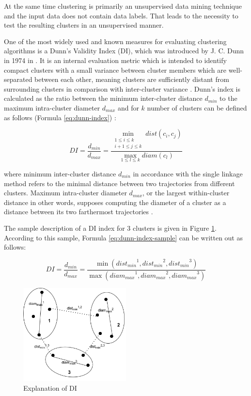 At the same time clustering is primarily an unsupervised data mining technique and the input data does not contain data labels. That leads to the necessity to test the resulting clusters in an unsupervised manner. 

One of the most widely used and known measures for evaluating clustering algorithms is a Dunn's Validity Index (DI), which was introduced by J. C. Dunn in 1974 in \cite{article:dunn_orig}. It is an internal evaluation metric which is intended to identify compact clusters with a small variance between cluster members which are well-separated between each other, meaning clusters are sufficiently distant from surrounding clusters in comparison with inter-cluster variance \cite{online:hier_clust_r}. Dunn's index is calculated as the ratio between the minimum inter-cluster distance $d_{min}$ to the maximum intra-cluster diameter $d_{max}$ and for $k$ number of clusters can be defined as follows (Formula \ref{eq:dunn-index}) \cite{article:quant_eval_perf_clust}:

\begin{equation} \label{eq:dunn-index}
	DI = \frac {d_{min}} {d_{max}} = \frac{\min\limits_{\substack{1 \leq i \leq k \\ i+1 \leq j \leq k}} dist(c_i, c_j)} {\max\limits_{1 \leq l \leq k} diam(c_l)}
\end{equation}

where minimum inter-cluster distance $d_{min}$ in accordance with the single linkage method refers to the minimal distance between two trajectories from different clusters. Maximum intra-cluster diameter $d_{max}$, or the largest within-cluster distance in other words, supposes computing the diameter of a cluster as a distance between its two farthermost trajectories \cite{inproceedings:clust_ind}. 

The sample description of a DI index for 3 clusters is given in Figure \ref{fig:di_sample}. According to this sample, Formula \ref{eq:dunn-index-sample} can be written out as follows:

\begin{equation} \label{eq:dunn-index-sample}
DI = \frac {d_{min}} {d_{max}} = \frac
	{\min ({dist_{min}}^1, {dist_{min}}^2, {dist_{min}}^3)}
	{\max ({diam_{max}}^1, {diam_{max}}^2, {diam_{max}}^3)}
\end{equation}

\begin{figure}[!htb]
	\centering{}
	\includegraphics[width=0.5\textwidth]{images/di-sample.png}
	\caption{Explanation of DI}
	\label{fig:di_sample}
\end{figure}


